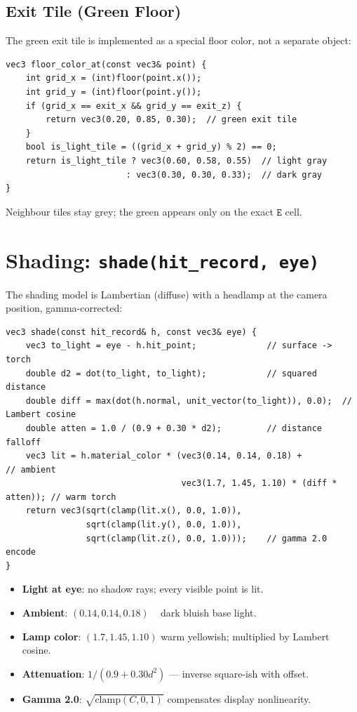 \subsection{Exit Tile (Green Floor)}
The green exit tile is implemented as a special floor color, not a separate object:
\begin{verbatim}
vec3 floor_color_at(const vec3& point) {
    int grid_x = (int)floor(point.x());
    int grid_y = (int)floor(point.y());
    if (grid_x == exit_x && grid_y == exit_z) {
        return vec3(0.20, 0.85, 0.30);  // green exit tile
    }
    bool is_light_tile = ((grid_x + grid_y) % 2) == 0;
    return is_light_tile ? vec3(0.60, 0.58, 0.55)  // light gray
                        : vec3(0.30, 0.30, 0.33);  // dark gray
}
\end{verbatim}
Neighbour tiles stay grey; the green appears only on the exact $\texttt{E}$ cell.

\section{Shading: \texttt{shade(hit\_record, eye)}}

The shading model is Lambertian (diffuse) with a headlamp at the camera position, gamma-corrected:
\begin{verbatim}
vec3 shade(const hit_record& h, const vec3& eye) {
    vec3 to_light = eye - h.hit_point;              // surface -> torch
    double d2 = dot(to_light, to_light);            // squared distance
    double diff = max(dot(h.normal, unit_vector(to_light)), 0.0);  // Lambert cosine
    double atten = 1.0 / (0.9 + 0.30 * d2);         // distance falloff
    vec3 lit = h.material_color * (vec3(0.14, 0.14, 0.18) +          // ambient
                                   vec3(1.7, 1.45, 1.10) * (diff * atten)); // warm torch
    return vec3(sqrt(clamp(lit.x(), 0.0, 1.0)),
                sqrt(clamp(lit.y(), 0.0, 1.0)),
                sqrt(clamp(lit.z(), 0.0, 1.0)));    // gamma 2.0 encode
}
\end{verbatim}
\begin{itemize}
    \item \textbf{Light at eye}: no shadow rays; every visible point is lit.
    \item \textbf{Ambient}: $(0.14, 0.14, 0.18)$ ~ dark bluish base light.
    \item \textbf{Lamp color}: $(1.7, 1.45, 1.10)$ warm yellowish; multiplied by Lambert cosine.
    \item \textbf{Attenuation}: $1 / (0.9 + 0.30 d^2)$ — inverse square-ish with offset.
    \item \textbf{Gamma 2.0}: $\sqrt{\text{clamp}(C, 0, 1)}$ compensates display nonlinearity.
\end{itemize}

